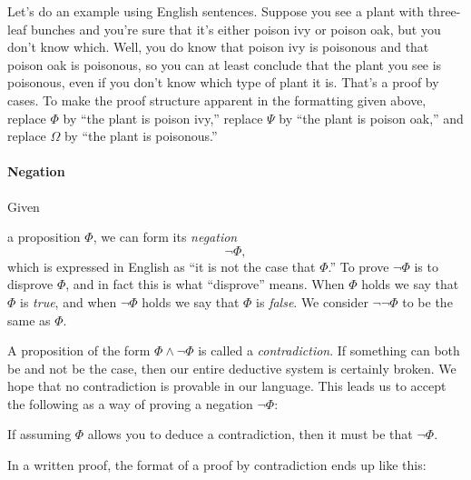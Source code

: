 \documentclass[12pt]{article}
\newcommand{\AND}{\wedge}
\newcounter{rule}
\newcounter{theorem}
\def\putRuleNumber{\refstepcounter{rule}\therule}
\def\putThmNumber{\refstepcounter{theorem}\thetheorem}
\newcommand{\indented}[1]{\begin{adjustwidth}{1em}{}#1\end{adjustwidth}}
\def\thmcolonspace{\hspace{0.2em}}
\newcommand{\thmbox}[1]{\fbox{\parbox{\textwidth}{{#1}}}}
\newcommand{\THM}[1]{\thmbox{\textbf{Theorem \putThmNumber:} \thmcolonspace #1}}
\newcommand{\RULE}[2]{\begin{tcolorbox}[title=Rule \putRuleNumber: #1,colbacktitle=white,coltitle=black,colback=white]#2\end{tcolorbox}}
\def\pA{\Phi}
\def\pB{\Psi}
\def\pC{\Omega}
\begin{document}
Let's do an example using English sentences.
Suppose you see a plant with three-leaf bunches and you're sure that it's either poison ivy or poison oak, but you don't know which.
Well, you do know that poison ivy is poisonous and that poison oak is poisonous, so you can at least conclude that the plant you see is poisonous, even
if you don't know which type of plant it is.
That's a proof by cases.
To make the proof structure apparent in
the formatting given above, replace $\pA$ by ``the plant is poison ivy,'' replace $\pB$ by ``the plant is poison oak,'' and replace $\pC$ by ``the plant is poisonous.''


\paragraph{Negation}
\hypertarget{hl:NOT}{Given} a proposition $\pA$, we can form its \emph{negation}
$$
\neg \pA,
$$
which is expressed in English as ``it is not the case that $\pA$.''
To prove $\neg\pA$ is to disprove $\pA$, and in fact this is what ``disprove'' means.
When $\pA$ holds we say that $\pA$ is \emph{true}, and when $\neg\pA$ holds we say that $\pA$ is \emph{false}.
We consider $\neg\neg\pA$ to be the same as $\pA$.

A proposition of the form $\pA\AND\neg\pA$ is called a \emph{contradiction}.
If something can both be and not be the case, then our entire deductive system is certainly broken.
We hope that no contradiction is provable in our language.
\hypertarget{hl:NOTPV}{This} leads us to accept the following as a way of proving a negation $\neg\pA$:
\RULE{Proof by contradiction}{
If assuming $\pA$ allows you to deduce a contradiction, then it must be that $\neg\pA$.
}
In a written proof, the format of a proof by contradiction ends up like this:
\end{document}
